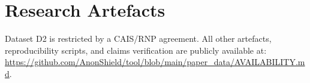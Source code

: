 \documentclass[12pt]{article}
\begin{document}





\section{Research Artefacts}
\label{sec:artefacts}
Dataset D2 is restricted by a CAIS/RNP agreement. All other artefacts, reproducibility scripts, and claims verification are publicly available at:
\url{https://github.com/AnonShield/tool/blob/main/paper_data/AVAILABILITY.md}.
\end{document}
